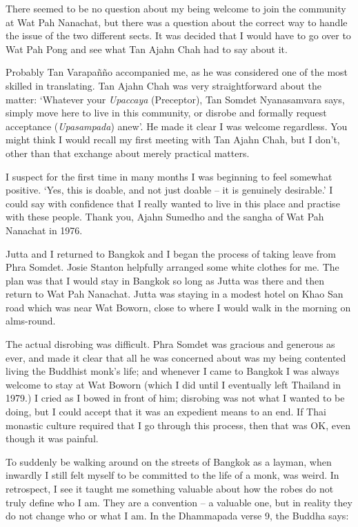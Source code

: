 There seemed to be no question about my being welcome to join the
community at Wat Pah Nanachat, but there was a question about the
correct way to handle the issue of the two different sects. It was
decided that I would have to go over to Wat Pah Pong and see what Tan
Ajahn Chah had to say about it.

Probably Tan Varapañño accompanied me, as he was considered one of the
most skilled in translating. Tan Ajahn Chah was very straightforward
about the matter: `Whatever your \emph{Upaccaya} (Preceptor), Tan Somdet
Nyanasamvara says, simply move here to live in this community, or
disrobe and formally request acceptance (\emph{Upasampada}) anew'. He
made it clear I was welcome regardless. You might think I would recall
my first meeting with Tan Ajahn Chah, but I don't, other than that
exchange about merely practical matters.

I suspect for the first time in many months I was beginning to feel
somewhat positive. `Yes, this is doable, and not just doable -- it is
genuinely desirable.' I could say with confidence that I really wanted
to live in this place and practise with these people. Thank you, Ajahn
Sumedho and the sangha of Wat Pah Nanachat in 1976.

Jutta and I returned to Bangkok and I began the process of taking leave
from Phra Somdet. Josie Stanton helpfully arranged some
white clothes for me. The plan was that I would stay in Bangkok so long
as Jutta was there and then return to Wat Pah Nanachat. Jutta was
staying in a modest hotel on Khao San road which was near Wat Boworn,
close to where I would walk in the morning on alms-round.

The actual disrobing was difficult. Phra Somdet was gracious and
generous as ever, and made it clear that all he was concerned about was
my being contented living the Buddhist monk's life; and whenever I came
to Bangkok I was always welcome to stay at Wat Boworn (which I did until
I eventually left Thailand in 1979.) I cried as I bowed in front of him; disrobing
was not what I wanted to be doing, but I could accept that it was an
expedient means to an end. If Thai monastic culture required that I go
through this process, then that was OK, even though it was painful.

To suddenly be walking around on the streets of Bangkok as a layman,
when inwardly I still felt myself to be committed to the life of a monk,
was weird. In retrospect, I see it taught me something valuable about
how the robes do not truly define who I am. They are a convention -- a
valuable one, but in reality they do not change who or what I am. In the
Dhammapada verse 9, the Buddha says:


